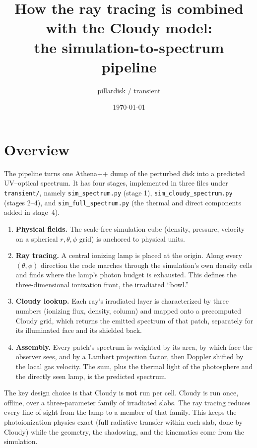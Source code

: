 \documentclass[11pt]{article}
\title{How the ray tracing is combined with the Cloudy model:\\
the simulation-to-spectrum pipeline}
\author{pillardisk / transient}
\date{\today}
\begin{document}
\maketitle

\section{Overview}

The pipeline turns one Athena++ dump of the perturbed disk into a
predicted UV--optical spectrum. It has four stages, implemented in
three files under \texttt{transient/}, namely
\texttt{sim\_spectrum.py} (stage 1),
\texttt{sim\_cloudy\_spectrum.py} (stages 2--4), and
\texttt{sim\_full\_spectrum.py} (the thermal and direct
components added in stage~4).

\begin{enumerate}
\item \textbf{Physical fields.} The scale-free simulation cube
      (density, pressure, velocity on a spherical $r,\theta,\phi$ grid)
      is anchored to physical units.
\item \textbf{Ray tracing.} A central ionizing lamp is placed at the
      origin. Along every $(\theta,\phi)$ direction the code marches
      through the simulation's own density cells and finds where the
      lamp's photon budget is exhausted. This defines the
      three-dimensional ionization front, the irradiated ``bowl.''
\item \textbf{Cloudy lookup.} Each ray's irradiated layer is
      characterized by three numbers (ionizing flux, density, column)
      and mapped onto a precomputed Cloudy grid, which returns the
      emitted spectrum of that patch, separately for its illuminated
      face and its shielded back.
\item \textbf{Assembly.} Every patch's spectrum is weighted by its
      area, by which face the observer sees, and by a Lambert
      projection factor, then Doppler shifted by the local gas
      velocity. The sum, plus the thermal light of the photosphere and
      the directly seen lamp, is the predicted spectrum.
\end{enumerate}

The key design choice is that Cloudy is \textbf{not} run per cell.
Cloudy is run once, offline, over a three-parameter family of
irradiated slabs. The ray tracing reduces every line of sight from the
lamp to a member of that family. This keeps the photoionization
physics exact (full radiative transfer within each slab, done by
Cloudy) while the geometry, the shadowing, and the kinematics come
from the simulation.
\end{document}

